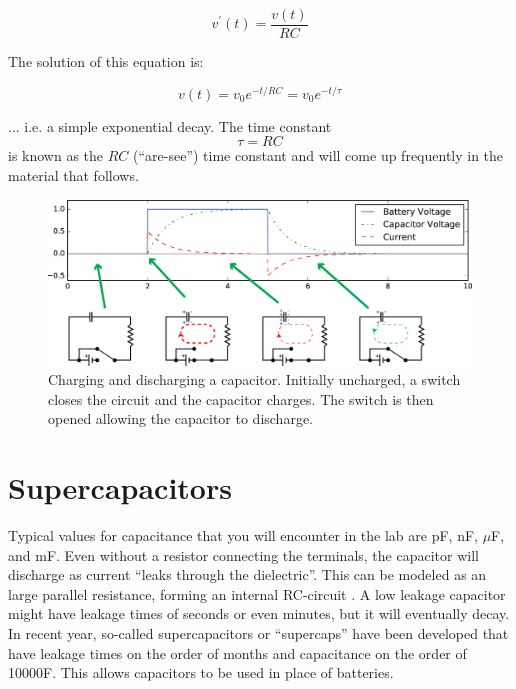 \documentclass{tufte-book}
\begin{document}
$$
v^\prime(t) =\frac{v(t)}{RC}
$$

\noindent The solution of this equation is:

\begin{equation}\label{eq:discharge}
v(t) = v_0e^{-t/RC} = v_0e^{-t/\tau}
\end{equation}

\noindent ... i.e. a simple exponential decay. The time constant 
\begin{equation}\label{eq:rctimeconst}
\tau = RC
\end{equation}
\noindent is known as the $RC$ (``are-see'')  time constant and will come up frequently in the material that follows.

\begin{figure}[h]
\caption{Charging and discharging a capacitor. Initially uncharged, a switch closes the circuit and the capacitor charges. The switch is then opened allowing the capacitor to discharge.}
\label{fig:chargedischarge}
\begin{center}
\includegraphics[width=\textwidth]{chargedischarge.png}
\end{center}
\end{figure}

\section{Supercapacitors}
Typical values for capacitance that you will encounter in the lab are pF, nF, $\mu$F, and mF. Even without a resistor connecting the terminals, the capacitor will discharge as current ``leaks through the dielectric''. This can be modeled as an large parallel resistance, forming an internal RC-circuit . A low leakage capacitor might have leakage times of seconds or even minutes, but it will eventually decay. In recent year, so-called supercapacitors or ``supercaps'' have been developed that have leakage times on the order of months and capacitance on the order of 10000F. This allows capacitors to be used in place of batteries.
\end{document}
